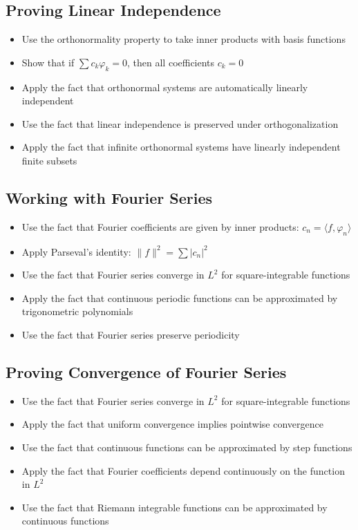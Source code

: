 \subsection*{Proving Linear Independence}
\begin{itemize}
\item Use the orthonormality property to take inner products with basis functions
\item Show that if $\sum c_k \varphi_k = 0$, then all coefficients $c_k = 0$
\item Apply the fact that orthonormal systems are automatically linearly independent
\item Use the fact that linear independence is preserved under orthogonalization
\item Apply the fact that infinite orthonormal systems have linearly independent finite subsets
\end{itemize}

\subsection*{Working with Fourier Series}
\begin{itemize}
\item Use the fact that Fourier coefficients are given by inner products: $c_n = \langle f, \varphi_n \rangle$
\item Apply Parseval's identity: $\|f\|^2 = \sum |c_n|^2$
\item Use the fact that Fourier series converge in $L^2$ for square-integrable functions
\item Apply the fact that continuous periodic functions can be approximated by trigonometric polynomials
\item Use the fact that Fourier series preserve periodicity
\end{itemize}

\subsection*{Proving Convergence of Fourier Series}
\begin{itemize}
\item Use the fact that Fourier series converge in $L^2$ for square-integrable functions
\item Apply the fact that uniform convergence implies pointwise convergence
\item Use the fact that continuous functions can be approximated by step functions
\item Apply the fact that Fourier coefficients depend continuously on the function in $L^2$
\item Use the fact that Riemann integrable functions can be approximated by continuous functions
\end{itemize}

